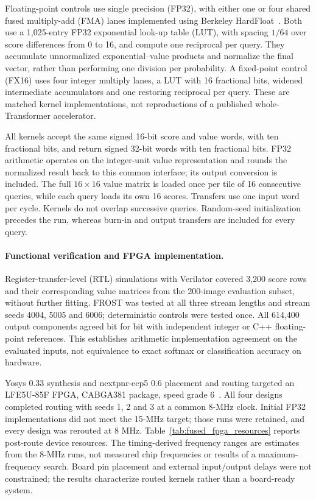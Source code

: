 Floating-point controls use single precision (FP32), with either one
or four shared fused multiply-add (FMA) lanes implemented using Berkeley
HardFloat~\cite{hauser2019hardfloat}. Both use a 1,025-entry FP32 exponential
look-up table (LUT), with spacing $1/64$ over score differences from 0 to 16,
and compute one reciprocal per query. They accumulate unnormalized
exponential--value products and normalize the final vector, rather than
performing one division per probability. A fixed-point control (FX16)
uses four integer multiply lanes, a LUT with 16 fractional bits, widened
intermediate accumulators and one restoring reciprocal per query.
These are matched kernel implementations, not reproductions of a published
whole-Transformer accelerator.

All kernels accept the same signed 16-bit score and value words, with ten
fractional bits, and return signed 32-bit words with ten fractional bits.
FP32 arithmetic operates on the integer-unit value representation and
rounds the normalized result back to this common interface; its output
conversion is included. The full $16\times16$ value matrix is loaded once
per tile of 16 consecutive queries, while each query loads its own 16
scores. Transfers use one input word per cycle. Kernels do not overlap
successive queries. Random-seed initialization precedes the run, whereas
burn-in and output transfers are included for every query.

\paragraph{Functional verification and FPGA implementation.}
Register-transfer-level (RTL) simulations with Verilator covered 3,200 score rows and their corresponding
value matrices from the 200-image evaluation subset, without further
fitting. FROST was tested at all three stream lengths and stream seeds
4004, 5005 and 6006; deterministic controls were tested once. All 614,400
output components agreed bit for bit with independent integer or C++
floating-point references. This establishes arithmetic implementation
agreement on the evaluated inputs, not equivalence to exact softmax or
classification accuracy on hardware.

Yosys 0.33 synthesis and nextpnr-ecp5 0.6 placement and routing targeted an
LFE5U-85F FPGA, CABGA381 package, speed grade 6~\cite{yosysSoftware,nextpnrSoftware}.
All four designs completed routing with seeds 1, 2 and 3 at a common
8-MHz clock. Initial FP32 implementations did not meet the 15-MHz target;
those runs were retained, and every design was rerouted at 8 MHz.
Table~\ref{tab:fused_fpga_resources} reports post-route device resources.
The timing-derived frequency ranges are estimates from the 8-MHz runs,
not measured chip frequencies or results of a maximum-frequency search.
Board pin placement and external input/output delays were not constrained;
the results characterize routed kernels rather than a board-ready system.

